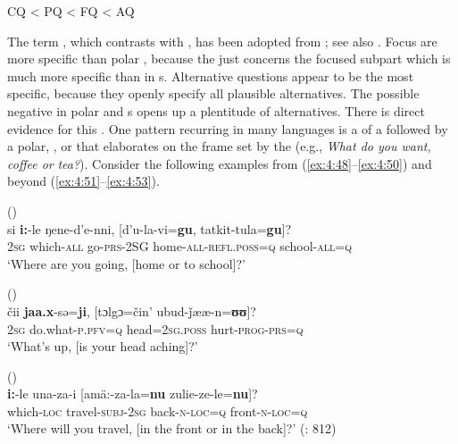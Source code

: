\ea\upshape%
    \label{ex:4:47}
    CQ < PQ < FQ < AQ
    \z

\noindent The term \textit{}, which contrasts with \textit{}, has been adopted from \citet[19]{Langacker2008}; see also \citet[238]{Arnheim1969}. Focus  are more specific than polar , because the  just concerns the focused subpart which is much more specific than in s. Alternative questions appear to be the most specific, because they openly specify all plausible alternatives. The possible negative  in polar and s opens up a plentitude of alternatives. There is direct evidence for this . One pattern recurring in many languages is a  of a  followed by a polar, , or  that elaborates on the frame set by the  (e.g., \textit{What do you want,} \textit{coffee or} \textit{tea?}). Consider the following examples from  (\ref{ex:4:48}--\ref{ex:4:50}) and beyond (\ref{ex:4:51}--\ref{ex:4:53}).

\ea%
    \label{ex:4:48}
     ()\\
    \gll si \textbf{i:}-le ŋene-d’e-nni, [{d’u-la-vi=}\textbf{gu}, tatkit-tula=\textbf{gu}]?\\
    2\textsc{sg}  which-\textsc{all}  go-\textsc{prs}-2SG  home-\textsc{all}-\textsc{refl.poss}=\textsc{q} school-\textsc{all}=\textsc{q}\\
    \glt ‘Where are you going, [home or to school]?’ \citep[7]{Nedjalkov1997}
    \z

\ea%
    \label{ex:4:49}
      ()\\
    \gll čii \textbf{jaa.x}-sə=\textbf{{ji}}, [{tɔlgɔ=čin’} ubud-ǰææ-n=\textbf{{ʊʊ}}]?\\
    2\textsc{sg}  do.what-\textsc{p.}\textsc{pfv}=\textsc{q}   head=2\textsc{sg.poss}  hurt-\textsc{prog}-\textsc{prs}=\textsc{q}\\
    \glt ‘What’s up, [is your head aching]?’ \citep[296]{Yamakoshi2015}
    \z

\ea%
    \label{ex:4:50}
     ()\\
    \gll \textbf{i:}-le una-za-i [{amä:}{-za-la=}\textbf{{nu}} zulie-ze-le=\textbf{{nu}}]?\\
    which-\textsc{loc}  travel-\textsc{subj}-2\textsc{sg}  back-\textsc{n}-\textsc{loc}=\textsc{q}    front-\textsc{n}-\textsc{loc}=\textsc{q}\\
    \glt ‘Where will you travel, [in the front or in the back]?’ (\citealt{NikolaevaTolskaya2001}: 812)
    \z

